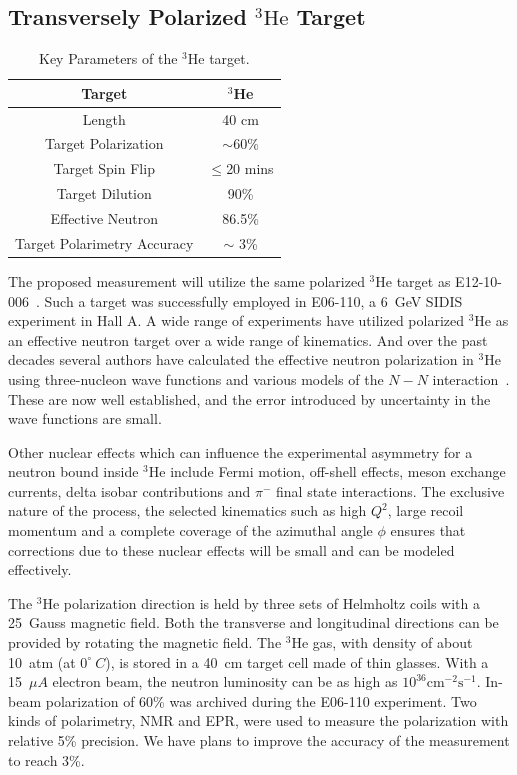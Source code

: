 \subsection {Transversely Polarized $\mathrm{^{3}He}$ Target}
\begin{table}[!ht]
\centering
\begin{tabular}{|c|c|}
\hline
Target                       & $^3$He              \\\hline 
Length                       & 40 cm               \\\hline          
Target Polarization          & $\sim$60\%          \\\hline 
Target Spin Flip             & $\leq$20 mins       \\\hline 
Target Dilution              & 90\%                \\\hline
Effective Neutron            & 86.5\%              \\\hline
Target Polarimetry Accuracy  & $\sim$ 3\%          \\\hline
\end{tabular}
\caption{\footnotesize{Key Parameters of the $\mathrm{^{3}He}$
    target.}\label{table:target}}
\end{table} 
The proposed measurement will utilize the same polarized $\mathrm{^{3}He}$
target as E12-10-006~\cite{solid:e12-10-006}. Such a target was successfully
employed in E06-110, a 6~GeV SIDIS experiment in Hall A.  A wide range of
experiments have utilized polarized $^3$He as an effective neutron target over
a wide range of kinematics. And over the past decades several authors have
calculated the effective neutron polarization in $^3$He using three-nucleon
wave functions and various models of the $N-N$ interaction~\cite{3hepol1}.
These are now well established, and the error introduced by uncertainty in the
wave functions are small.

Other nuclear effects which can influence the experimental asymmetry for a
neutron bound inside $^3$He include Fermi motion, off-shell effects, meson
exchange currents, delta isobar contributions and $\pi^-$ final state
interactions. The exclusive nature of the process, the selected kinematics such
as high $Q^2$, large recoil momentum and a complete coverage of the azimuthal
angle $\phi$ ensures that corrections due to these nuclear effects will be
small and can be modeled effectively.

The $\mathrm{^{3}He}$ polarization direction is held by three sets of Helmholtz
coils with a 25~Gauss magnetic field. Both the transverse and longitudinal
directions can be provided by rotating the magnetic field. The
$\mathrm{^{3}He}$ gas, with density of about 10~atm (at $0^{\circ}~C$), is stored
in a 40~cm target cell made of thin glasses. With a 15~$\mu A$ electron beam,
the neutron luminosity can be as high as $\mathrm{10^{36} cm^{-2}s^{-1}}$. In-beam
polarization of 60\% was archived during the E06-110 experiment. Two kinds of
polarimetry, NMR and EPR, were used to measure the polarization with relative
5\% precision. We have plans to improve the accuracy of the measurement to
reach 3\%.

